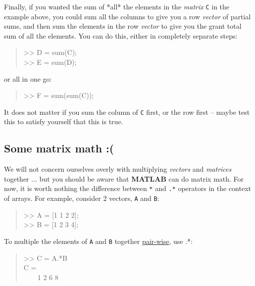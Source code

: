 \documentclass{tufte-book} %
\newenvironment{docspec}{\begin{quotation}\ttfamily\parskip0pt\parindent0pt\ignorespaces}{\end{quotation}}
\begin{document}
Finally, if you wanted the sum of *all* the elements in the \textit{matrix} \texttt{C} in the example above, you could sum all the columns to give you a row \textit{vector} of partial sums, and then sum the elements in the row \textit{vector} to give you the grant total sum of all the elements. You can do this, either in completely separate steps:
\begin{docspec}
>> D = sum(C);\\
>> E = sum(D);
\end{docspec}
or all in one go:
\begin{docspec}
>> F = sum(sum(C));
\end{docspec}

It does not matter if you sum the column of \texttt{C} first, or the row first -- maybe test this to satisfy yourself that this is true.


\subsection{Some matrix math :(}

We will not concern ourselves overly with multiplying \textit{vectors} and \textit{matrices} together ... but you should be aware that \textbf{MATLAB} can do matrix math. For now, it is worth nothing the difference between \texttt{*} and \texttt{.*} operators in the context of arrays. For example, consider 2 vectors, \texttt{A} and \texttt{B}:

\begin{docspec}
>> A = [1 1 2 2];\\
>> B = [1 2 3 4];
\end{docspec}

To multiple the elements of \texttt{A} and \texttt{B} together \uline{pair-wise}, use .*:

\begin{docspec}
>> C = A.*B
\\
C =\\
\ \ \ \ 1     2     6     8
\end{docspec}
\end{document}
